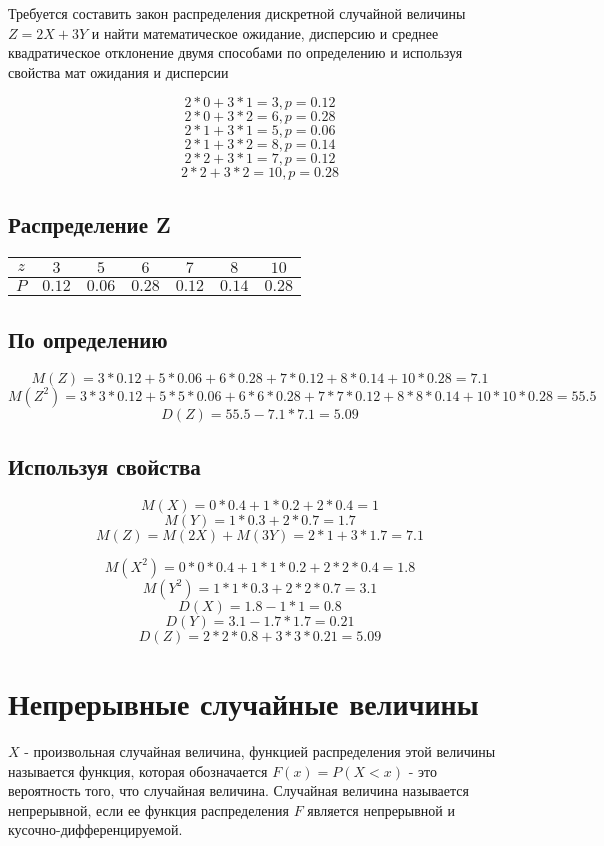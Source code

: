 \documentclass[a4paper]{article}
\begin{document}
Требуется составить закон распределения дискретной случайной величины $Z = 2X + 3Y$ и найти математическое ожидание, дисперсию и среднее квадратическое отклонение 
двумя способами по определению и используя свойства мат ожидания и дисперсии     

$$ 2*0 + 3*1 = 3, p = 0.12$$
$$ 2*0 + 3*2 = 6, p = 0.28$$
$$ 2*1 + 3*1 = 5, p = 0.06$$
$$ 2*1 + 3*2 = 8, p = 0.14$$
$$ 2*2 + 3*1 = 7, p = 0.12$$
$$ 2*2 + 3*2 = 10, p = 0.28$$

\subsection{Распределение Z}
\begin{table}[H]
\centering
\begin{tabular}{|c|c|c|c|c|c|c|}
\hline
$z$ & $3$ & $5$ & $6$  & $7$  & $8$  & $10$ \\
\hline
$P$ & $0.12$ & $0.06$ & $0.28$ & $0.12$ & $0.14$ & $0.28$\\
\hline
\end{tabular}
\end{table}

\subsection{По определению}
$$M(Z) = 3 * 0.12 + 5 * 0.06 + 6 * 0.28 + 7 * 0.12 + 8 * 0.14 + 10 * 0.28 = 7.1 $$
$$M(Z^2) =  3*3*0.12 + 5*5*0.06 + 6*6*0.28 + 7*7*0.12 + 8*8*0.14 + 10*10*0.28 = 55.5 $$
$$D(Z) = 55.5 - 7.1 * 7.1 = 5.09 $$ 

\subsection{Используя свойства}
$$ M(X) = 0 * 0.4 + 1 * 0.2 + 2 * 0.4 = 1 $$
$$ M(Y) = 1 * 0.3 + 2 * 0.7 = 1.7 $$
$$ M(Z) = M(2X) + M(3Y) = 2 * 1 + 3 * 1.7 = 7.1 $$

$$ M(X^2) = 0*0*0.4 + 1*1*0.2 + 2*2*0.4 = 1.8 $$  
$$ M(Y^2) = 1*1 * 0.3 + 2*2*0.7 = 3.1 $$
$$ D(X) = 1.8 - 1*1 = 0.8 $$
$$ D(Y) = 3.1 - 1.7*1.7 = 0.21 $$
$$ D(Z) = 2*2*0.8 + 3*3*0.21 = 5.09 $$


\section{Непрерывные случайные величины}

$X$ - произвольная случайная величина, функцией распределения этой величины называется функция, которая обозначается $F(x) = P(X < x)$ - это вероятность того, что случайная величина.
Случайная величина называется непрерывной, если ее функция распределения $F$ является непрерывной и кусочно-дифференцируемой.
\end{document}
